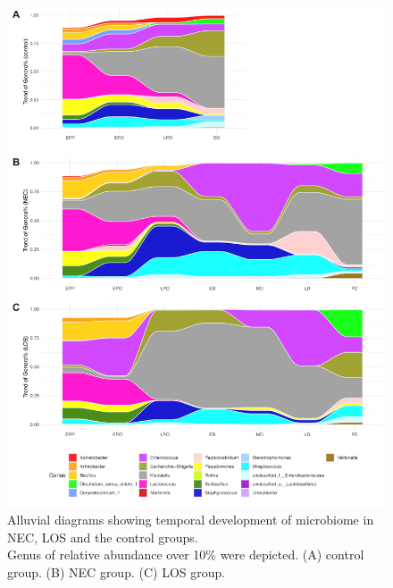 \documentclass[fleqn,10pt, lineno]{wlpeerj} %
\begin{document}
\begin{figure}[ht]\centering
  \includegraphics[width=\linewidth]{taxon.pdf}
  \caption{Alluvial diagrams showing temporal development of microbiome in NEC, LOS and the control groups. \\ Genus of relative abundance over 10\% were depicted. (A) control group. (B) NEC group. (C) LOS group.}
  \label{fig:taxa-time}
\end{figure}




\end{document}
